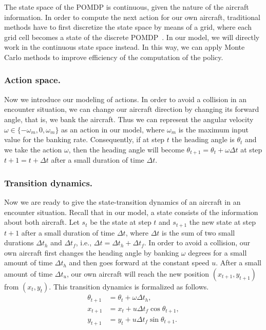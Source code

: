 \documentclass[orivec]{llncs}
\begin{document}
The state space of the POMDP is continuous, given the nature of the aircraft information.
In order to compute the next action for our own aircraft, traditional methods have to first discretize the state space by means of a grid, where each grid cell becomes a state of the discrete POMDP~\cite{article}.
In our model, we will directly work in the continuous state space instead.
In this way, we can apply Monte Carlo methods to improve efficiency of the computation of the policy. 

\subsubsection{Action space.}
Now we introduce our modeling of actions.
In order to avoid a collision in an encounter situation, we can change our aircraft direction by changing its forward angle, that is, we bank the aircraft.
Thus we can represent the angular velocity $\omega \in \{-\omega_{m}, 0, \omega_{m}\}$ as an action in our model, where $\omega_{m}$ is the maximum input value for the banking rate.
Consequently, if at step $t$ the heading angle is $\theta_{t}$ and we take the action $\omega$, then the heading angle will become $\theta_{t+1} = \theta_{t} + \omega \Delta t$ at step $t+1 = t + \Delta t$ after a small duration of time $\Delta t$.

\subsubsection{Transition dynamics.}
Now we are ready to give the state-transition dynamics of an aircraft in an encounter situation.
Recall that in our model, a state consists of the information about both aircraft.
Let $s_{t}$ be the state at step $t$ and $s_{t+1}$ the new state at step $t+1$ after a small duration of time $\Delta t$, where $\Delta t$ is the sum of two small durations $\Delta t_{h}$ and $\Delta t_{f}$, i.e., $\Delta t = \Delta t_{h} + \Delta t_{f}$.
In order to avoid a collision, our own aircraft first changes the heading angle by banking $\omega$ degrees for a small amount of time $\Delta t_{h}$ and then goes forward at the constant speed $u$.
After a small amount of time $\Delta t_{u}$, our own aircraft will reach the new position $(x_{t+1}, y_{t+1})$ from $(x_{t},y_{t})$.
This transition dynamics is formalized as follows.
\begin{equation} 
\label{eq:transition}
	\begin{split}
		\theta_{t+1} &= \theta_{t} + \omega \Delta t_{h},\\
		x_{t+1} &= x_{t} + u \Delta t_{f} \cos \theta_{t+1},\\
		y_{t+1} &= y_{t} + u \Delta t_{f} \sin \theta_{t+1}.
	\end{split}
\end{equation}
\end{document}
